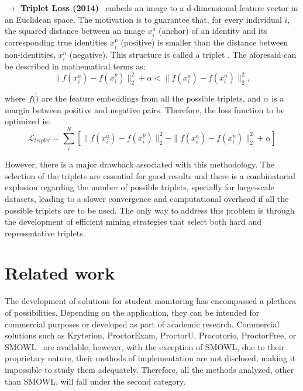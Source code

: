 \documentclass[class=report, crop=false, a4paper, 12pt]{standalone}
\begin{document}
\vspace{0.7\baselineskip}
\noindent\textbf{$\rightarrow$ Triplet Loss (2014)}~\autocite{schroffFaceNetUnifiedEmbedding2015} embeds an image to a d-dimensional feature vector in an Euclidean space. The motivation is to guarantee that, for every individual $i$, the squared distance between an image $x^{a}_{i}$ (anchor) of an identity and its corresponding true identities $x^{p}_{i}$ (positive) is smaller than the distance between non-identities, $x^{n}_{i}$ (negative). This structure is called a triplet . The aforesaid can be described in mathematical terms as:
\begin{equation}
\|f(x^{a}_{i})-f(x^{p}_{i})\|^{2}_{2} + \alpha < \|f(x^{a}_{i})-f(x^{n}_{i})\|^{2}_{2},
\end{equation}

\noindent where $f(\dot)$ are the feature embeddings from all the possible triplets, and $\alpha$ is a margin between positive and negative pairs. Therefore, the loss function to be optimized is:
\begin{equation}
\mathcal{L}_{triplet} = \sum_{i}^{N}\left[\|f(x^{a}_{i})-f(x^{p}_{i})\|^{2}_{2}-\|f(x^{a}_{i})-f(x^{n}_{i})\|^{2}_{2}+\alpha\right]
\end{equation}

However, there is a major drawback associated with this methodology. The selection of the triplets are essential for good results and there is a combinatorial explosion regarding the number of possible triplets, specially for large-scale datasets, leading to a slower convergence and computational overhead if all the possible triplets are to be used. The only way to address this problem is through the development of efficient mining strategies that select both hard and representative triplets.

\section{Related work}
\label{sec:related_work}
The development of solutions for student monitoring has encompassed a plethora of possibilities. Depending on the application, they can be intended for commercial purposes or developed as part of academic research. Commercial solutions such as Kryterion, ProctorExam, ProctorU, Procotorio, ProctorFree, or SMOWL~\autocite{labayenOnlineStudentAuthentication2021} are available; however, with the exception of SMOWL, due to their proprietary nature, their methods of implementation are not disclosed, making it impossible to study them adequately. Therefore, all the methods analyzed, other than SMOWL, will fall under the second category.
\end{document}
